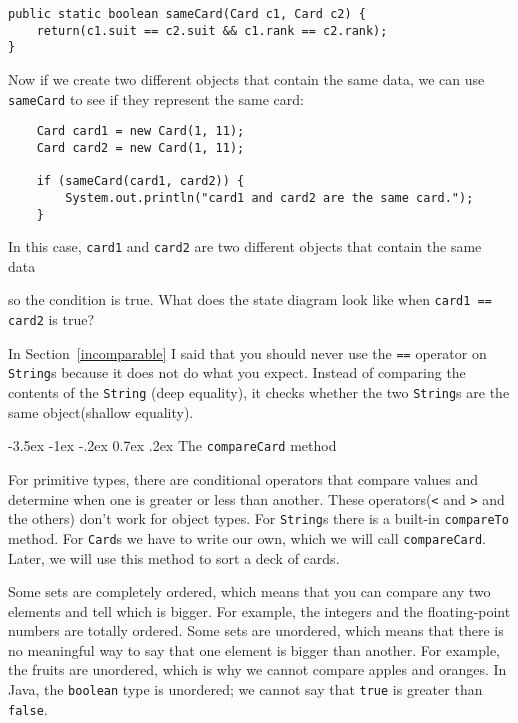 \documentclass{book}
\makeatletter
\renewcommand{\section}{\@startsection 
    {section} {1} {0mm}%
    {-3.5ex \@plus -1ex \@minus -.2ex}%
    {0.7ex \@plus.2ex}%
    {\normalfont\Large\bfseries}}
\newcommand{\beforefig}{\vspace{1.3\parskip}}
\newcommand{\afterfig}{\vspace{-0.2\parskip}}
\newcommand{\myfig}[1]{
    \beforefig
    \centerline{\epsfig{#1,scale=0.8}}
    \afterfig
}
\makeatother
\begin{document}
\begin{verbatim}
public static boolean sameCard(Card c1, Card c2) {
    return(c1.suit == c2.suit && c1.rank == c2.rank);
}
\end{verbatim}
%
Now if we create two different objects that contain the same
data, we can use {\tt sameCard} to see if they represent the
same card:

\begin{verbatim}
    Card card1 = new Card(1, 11);
    Card card2 = new Card(1, 11);

    if (sameCard(card1, card2)) {
        System.out.println("card1 and card2 are the same card.");
    }
\end{verbatim}
%
In this case, {\tt card1} and {\tt card2}
are two different objects that contain the same data

\myfig{figure=figs/card.eps}

so the condition is true.  What does the state diagram look like when
{\tt card1 == card2} is true?


In Section~\ref{incomparable} I said that you should never use the
{\tt ==} operator on {\tt String}s because it does not do what you
expect.  Instead of comparing the contents of the {\tt String}
(deep equality), it checks whether the two {\tt String}s are the
same object(shallow equality).


\section{The {\tt compareCard} method}

For primitive types, there are conditional operators that
compare values and determine when one is greater or less
than another.  These operators({\tt <} and {\tt >} and the others)
don't work for object types.  For {\tt String}s there is
a built-in {\tt compareTo} method.  For {\tt Card}s we have
to write our own, which we will call {\tt compareCard}.
Later, we will use this method to sort a deck of cards.


Some sets are completely ordered, which means that you can
compare any two elements and tell which is bigger.  For
example, the integers and the floating-point numbers are
totally ordered.  Some sets are unordered, which means that
there is no meaningful way to say that one element is bigger
than another.  For example, the fruits are unordered, which
is why we cannot compare apples and oranges.  In Java,
the {\tt boolean} type is unordered; we cannot say that
{\tt true} is greater than {\tt false}.
\end{document}
